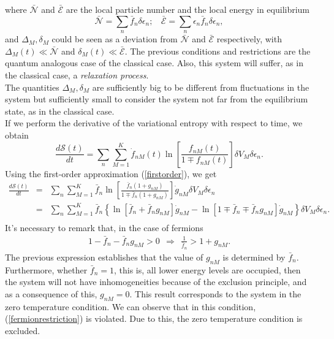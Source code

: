 \documentclass{article}
\newcommand{\de}{\delta}
\newcommand{\Ss}{\mathcal{S}}
\begin{document}
  where $\bar {\mathcal{N}}$ and $\bar{\mathcal{E}}$ are the local particle number and the local energy in equilibrium
  \begin{equation}
      \bar{\mathcal{N}}= \sum_n \bar{f}_n \delta \epsilon_n; \ \ \ \ \bar{\mathcal{E}}= \sum_n \epsilon_n\bar{f}_n \delta \epsilon_n,
  \end{equation}
  and $\Delta_M,\delta_M$ could be seen as a deviation from $\bar{\mathcal{N}}$ and $\bar{\mathcal{E}}$ respectively, with $\Delta_M(t)\ll \bar{\mathcal{N}}$ and $\delta_M(t) \ll \bar{\mathcal{E}}$. The previous conditions and restrictions are the quantum analogous case of the classical case. Also, this system will suffer, as in the classical case, a \textit{relaxation process}.\\
  The quantities $\Delta_M,\delta_M$ are sufficiently big to be different from fluctuations in the system but sufficiently small to consider the system not far from the equilibrium state, as in the classical case.  \\
If we perform the derivative of the variational entropy with respect to time, we obtain
\begin{equation}
   \frac{d \Ss (t)}{dt}= \sum_n \sum_{M=1}^{K} \dot{f}_{nM}(t)\ln \left[ \frac{f_{nM}(t)}{1\mp f_{nM}(t)} \right] \de V_M \delta \epsilon_n.\label{deltaH}
\end{equation}{}
Using the first-order approximation (\ref{firstorder}), we get
\begin{eqnarray}
    \frac{d\Ss (t)}{dt}&=&\sum_n \sum_{M=1}^{K} \bar{f}_{n}\ln \left[ \frac{\bar{f}_{n}(1+g_{nM})}{1\mp \bar{f}_{n} (1+ g_{nM})} \right]\dot{g}_{nM} \de V_M\delta \epsilon_n \nonumber \\
    &=&\sum_n \sum_{M=1}^{K} \bar{f}_n \left \{ \ln [\bar{f}_n+\bar{f}_n g_{nM}]\dot{g}_{nM}-\ln [1\mp\bar{f}_n\mp\bar{f}_n g_{nM}]\dot{g}_{nM}  \right \}\de V_M \delta \epsilon_n.\nonumber \\
    \label{cambioH1}
\end{eqnarray}{}
It's necessary to remark that, in the case of fermions
\begin{eqnarray}
   1-\bar f_n -\bar f_n g_{nM}>0 \ \ \Rightarrow \ \ \frac{1}{\bar f_n}>1+g_{nM}. \label{fermionrestriction}
\end{eqnarray}{}
The previous expression establishes that the value of $g_{nM}$ is determined by $\bar f_n$. Furthermore, whether $\bar f_{n}=1$, this is, all lower energy levels are occupied, then the system will not have inhomogeneities because of the exclusion principle, and as a consequence of this,  $g_{nM}=0$. This result corresponds to the system in the zero temperature condition. We can observe that in this condition, (\ref{fermionrestriction}) is violated. Due to this, the zero temperature condition is excluded.\\
\end{document}
